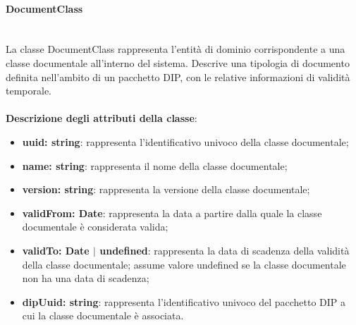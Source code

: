 \documentclass[a4paper,12pt]{article}
\begin{document}
{                \paragraph{DocumentClass}\label{par:DocumentClass}\mbox{}\\
                La classe DocumentClass rappresenta l'entità di dominio corrispondente a una classe documentale all'interno del sistema. Descrive una tipologia di documento definita nell'ambito di un pacchetto DIP, con le relative informazioni di validità temporale.\\
                \\
                \textbf{Descrizione degli attributi della classe}:
                \begin{itemize}
                    \item \textbf{uuid: string}: rappresenta l'identificativo univoco della classe documentale;
                    \item \textbf{name: string}: rappresenta il nome della classe documentale;
                    \item \textbf{version: string}: rappresenta la versione della classe documentale;
                    \item \textbf{validFrom: Date}: rappresenta la data a partire dalla quale la classe documentale è considerata valida;
                    \item \textbf{validTo: Date $|$ undefined}: rappresenta la data di scadenza della validità della classe documentale; assume valore undefined se la classe documentale non ha una data di scadenza;
                    \item \textbf{dipUuid: string}: rappresenta l'identificativo univoco del pacchetto DIP a cui la classe documentale è associata.
                \end{itemize}

}
\end{document}
